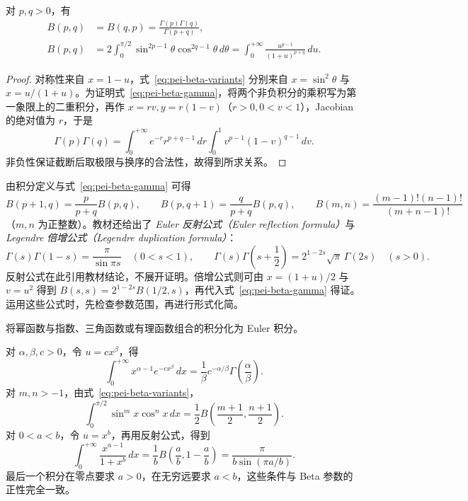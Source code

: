 \begin{proposition}
\label{prop:pei-beta-gamma}
对 $p,q>0$，有
\begin{align}
B(p,q)&=B(q,p)=\frac{\Gamma(p)\Gamma(q)}{\Gamma(p+q)},
\label{eq:pei-beta-gamma}\\
B(p,q)&=2\int_0^{\pi/2}\sin^{2p-1}\theta\cos^{2q-1}\theta\,d\theta
=\int_0^{+\infty}\frac{u^{p-1}}{(1+u)^{p+q}}\,du.
\label{eq:pei-beta-variants}
\end{align}
\end{proposition}
\begin{proof}
对称性来自 $x=1-u$，式~\eqref{eq:pei-beta-variants} 分别来自 $x=\sin^2\theta$ 与 $x=u/(1+u)$。为证明式~\eqref{eq:pei-beta-gamma}，将两个非负积分的乘积写为第一象限上的二重积分，再作 $x=rv,y=r(1-v)$（$r>0,0<v<1$），Jacobian 的绝对值为 $r$，于是
\[
\Gamma(p)\Gamma(q)
=\int_0^{+\infty}e^{-r}r^{p+q-1}\,dr
\int_0^1v^{p-1}(1-v)^{q-1}\,dv.
\]
非负性保证截断后取极限与换序的合法性，故得到所求关系。
\end{proof}

由积分定义与式~\eqref{eq:pei-beta-gamma} 可得
\[
B(p+1,q)=\frac{p}{p+q}B(p,q),\qquad
B(p,q+1)=\frac{q}{p+q}B(p,q),\qquad
B(m,n)=\frac{(m-1)!(n-1)!}{(m+n-1)!}
\]
（$m,n$ 为正整数）。教材还给出了 \emph{Euler 反射公式（Euler reflection formula）}与 \emph{Legendre 倍增公式（Legendre duplication formula）}：
\begin{equation}
\label{eq:pei-gamma-reflection-duplication}
\Gamma(s)\Gamma(1-s)=\frac{\pi}{\sin\pi s}\quad(0<s<1),\qquad
\Gamma(s)\Gamma\!\left(s+\frac12\right)
=2^{1-2s}\sqrt\pi\,\Gamma(2s)\quad(s>0).
\end{equation}
反射公式在此引用教材结论，不展开证明。倍增公式则可由 $x=(1+u)/2$ 与 $v=u^2$ 得到
$B(s,s)=2^{1-2s}B(1/2,s)$，再代入式~\eqref{eq:pei-beta-gamma} 得证。运用这些公式时，先检查参数范围，再进行形式化简。

\begin{example}
\label{ex:pei-euler-model-integrals}
将幂函数与指数、三角函数或有理函数组合的积分化为 Euler 积分。
\end{example}
\begin{solve}
对 $\alpha,\beta,c>0$，令 $u=cx^\beta$，得
\[
\int_0^{+\infty}x^{\alpha-1}e^{-cx^\beta}\,dx
=\frac1\beta c^{-\alpha/\beta}\Gamma\!\left(\frac\alpha\beta\right).
\]
对 $m,n>-1$，由式~\eqref{eq:pei-beta-variants}，
\[
\int_0^{\pi/2}\sin^m x\cos^n x\,dx
=\frac12B\!\left(\frac{m+1}2,\frac{n+1}2\right).
\]
对 $0<a<b$，令 $u=x^b$，再用反射公式，得到
\[
\int_0^{+\infty}\frac{x^{a-1}}{1+x^b}\,dx
=\frac1b B\!\left(\frac ab,1-\frac ab\right)
=\frac{\pi}{b\sin(\pi a/b)}.
\]
最后一个积分在零点要求 $a>0$，在无穷远要求 $a<b$，这些条件与 Beta 参数的正性完全一致。
\end{solve}

